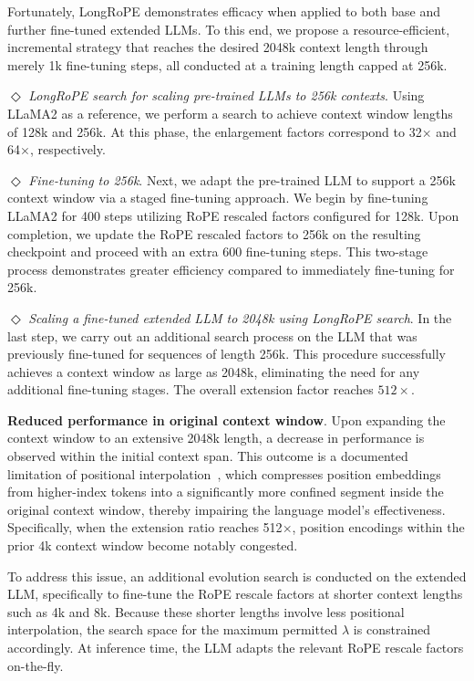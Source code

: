 Fortunately, LongRoPE demonstrates efficacy when applied to both base and further fine-tuned extended LLMs. To this end, we propose a resource-efficient, incremental strategy that reaches the desired 2048k context length through merely 1k fine-tuning steps, all conducted at a training length capped at 256k.

$\Diamond$ \textit{LongRoPE search for scaling pre-trained LLMs to 256k contexts}. Using LLaMA2 as a reference, we perform a search to achieve context window lengths of 128k and 256k. At this phase, the enlargement factors correspond to 32$\times$ and 64$\times$, respectively.

$\Diamond$ \textit{Fine-tuning to 256k}. Next, we adapt the pre-trained LLM to support a 256k context window via a staged fine-tuning approach. We begin by fine-tuning LLaMA2 for 400 steps utilizing RoPE rescaled factors configured for 128k. Upon completion, we update the RoPE rescaled factors to 256k on the resulting checkpoint and proceed with an extra 600 fine-tuning steps. This two-stage process demonstrates greater efficiency compared to immediately fine-tuning for 256k.

$\Diamond$ \textit{Scaling a fine-tuned extended LLM to 2048k using LongRoPE search}. In the last step, we carry out an additional search process on the LLM that was previously fine-tuned for sequences of length 256k. This procedure successfully achieves a context window as large as 2048k, eliminating the need for any additional fine-tuning stages. The overall extension factor reaches $512\times$.

\textbf{Reduced performance in original context window}. Upon expanding the context window to an extensive 2048k length, a decrease in performance is observed within the initial context span. This outcome is a documented limitation of positional interpolation~\cite{pi}, which compresses position embeddings from higher-index tokens into a significantly more confined segment inside the original context window, thereby impairing the language model's effectiveness. Specifically, when the extension ratio reaches 512$\times$, position encodings within the prior 4k context window become notably congested.

To address this issue, an additional evolution search is conducted on the extended LLM, specifically to fine-tune the RoPE rescale factors at shorter context lengths such as 4k and 8k. Because these shorter lengths involve less positional interpolation, the search space for the maximum permitted $\lambda$ is constrained accordingly. At inference time, the LLM adapts the relevant RoPE rescale factors on-the-fly.

